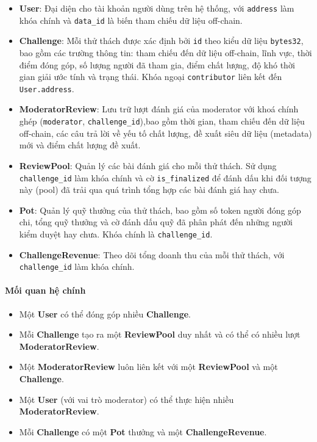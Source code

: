     \begin{itemize}
      \item \textbf{User}: Đại diện cho tài khoản người dùng trên hệ thống, với \texttt{address} làm khóa chính và \texttt{data\_id} là biến tham chiếu dữ liệu off-chain.
      \item \textbf{Challenge}: Mỗi thử thách được xác định bởi \texttt{id} theo kiểu dữ liệu \texttt{bytes32}, bao gồm các trường thông tin: tham chiếu đến dữ liệu off-chain, lĩnh vực, thời điểm đóng góp, số lượng người đã tham gia, điểm chất lượng, độ khó thời gian giải ước tính và trạng thái. Khóa ngoại \texttt{contributor} liên kết đến \texttt{User.address}.
      \item \textbf{ModeratorReview}: Lưu trữ lượt đánh giá của moderator với khoá chính ghép (\texttt{moderator}, \texttt{challenge\_id}),bao gồm thời gian, tham chiếu đến dữ liệu off-chain, các câu trả lời về yếu tố chất lượng, đề xuất siêu dữ liệu (metadata) mới và điểm chất lượng đề xuất.
      \item \textbf{ReviewPool}: Quản lý các bài đánh giá cho mỗi thử thách. Sử dụng \texttt{challenge\_id} làm khóa chính và cờ \texttt{is\_finalized} để đánh dấu khi đối tượng này (pool) đã trải qua quá trình tổng hợp các bài đánh giá hay chưa.
      \item \textbf{Pot}: Quản lý quỹ thưởng của thử thách, bao gồm số token người đóng góp chi, tổng quỹ thưởng và cờ đánh dấu quỹ đã phân phát đến những người kiểm duyệt hay chưa. Khóa chính là \texttt{challenge\_id}.
      \item \textbf{ChallengeRevenue}: Theo dõi tổng doanh thu của mỗi thử thách, với \texttt{challenge\_id} làm khóa chính.
    \end{itemize}

  \paragraph{Mối quan hệ chính}

    \begin{itemize}
      \item Một \textbf{User} có thể đóng góp nhiều \textbf{Challenge}.
      \item Mỗi \textbf{Challenge} tạo ra một \textbf{ReviewPool} duy nhất và có thể có nhiều lượt \textbf{ModeratorReview}.
      \item Một \textbf{ModeratorReview} luôn liên kết với một \textbf{ReviewPool} và một \textbf{Challenge}.
      \item Một \textbf{User} (với vai trò moderator) có thể thực hiện nhiều \textbf{ModeratorReview}.
      \item Mỗi \textbf{Challenge} có một \textbf{Pot} thưởng và một \textbf{ChallengeRevenue}.
    \end{itemize}


